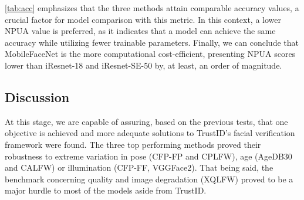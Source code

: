 \documentclass[class=report, crop=false, a4paper, 12pt]{standalone}
\begin{document}
\begin{table}[H]
    \centering
    \caption{Number of trainable parameters per unit of accuracy for the three highest achieving models.}
    \label{tab:param_acc}
\end{table}

\par \autoref{tab:acc} emphasizes that the three methods attain comparable accuracy values, a crucial factor for model comparison with this metric. In this context, a lower NPUA value is preferred, as it indicates that a model can achieve the same accuracy while utilizing fewer trainable parameters. Finally, we can conclude that MobileFaceNet is the more computational cost-efficient, presenting NPUA scores lower than iResnet-18 and iResnet-SE-50 by, at least, an order of magnitude.


\subsection{Discussion}
\par At this stage, we are capable of assuring, based on the previous tests, that one objective is achieved and more adequate solutions to TrustID's facial verification framework were found. The three top performing methods proved their robustness to extreme variation in pose (CFP-FP and CPLFW), age (AgeDB30 and CALFW) or illumination (CFP-FF, VGGFace2). That being said, the benchmark concerning quality and image degradation (XQLFW) proved to be a major hurdle to most of the models aside from TrustID.
\end{document}
